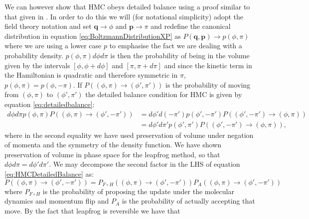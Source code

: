 \documentclass[12pt]{article}
\begin{document}
            We can however show that HMC obeys detailed balance using a proof similar to that given in \cite{duane_kennedy_pendleton_roweth_1987}. In order to do this we will (for notational simplicity) adopt the field theory notation and set $\bm{q}\rightarrow \phi$ and $\bm{p}\rightarrow \pi$ and redefine the canonical distribution in equation \ref{eq:BoltzmannDistributionXP} as $P\left(\bm{q},\bm{p}\right) \rightarrow p\left(\phi,\pi\right)$ where we are using a lower case $p$ to emphasise the fact we are dealing with a probability density. $p\left(\phi,\pi\right)d\phi d\pi$ is then the probability of being in the volume given by the intervals $\left[\phi,\phi+d\phi\right]$ and  $\left[\pi,\pi+d\pi\right]$ and since the kinetic term in the Hamiltonian is quadratic and therefore symmetric in $\pi$, $p\left(\phi,\pi\right)=p\left(\phi,-\pi\right)$. If $P\left(\left(\phi,\pi\right)\rightarrow\left(\phi',\pi'\right)\right)$ is the probability of moving from $\left(\phi,\pi\right)$ to $\left(\phi',\pi'\right)$ the detailed balance condition for HMC is given by equation \ref{eq:detailedbalance}:
            \begin{align}
                \label{eq:HMCDetailedBalance}
                d\phi d\pi p\left(\phi,\pi\right) P\left(\left(\phi,\pi\right)\rightarrow\left(\phi',-\pi'\right)\right) & = d\phi' d\left(-\pi'\right) p\left(\phi',-\pi'\right) P\left(\left(\phi',-\pi'\right)\rightarrow\left(\phi,\pi\right)\right) \\
                & = d\phi' d\pi' p\left(\phi',\pi'\right) P\left(\left(\phi',-\pi'\right)\rightarrow\left(\phi,\pi\right)\right),
            \end{align}
            where in the second equality we have used preservation of volume under negation of momenta and the symmetry of the density function. We have shown preservation of volume in phase space for the leapfrog method, so that $d\phi d\pi = d\phi' d\pi'$. We may decompose the second factor in the LHS of equation \ref{eq:HMCDetailedBalance} as:
            \begin{equation}
                P\left(\left(\phi,\pi\right) \rightarrow \left(\phi',-\pi'\right)\right) = P_{F\circ H}\left(\left(\phi,\pi\right) \rightarrow \left(\phi',-\pi'\right)\right)P_{A}\left(\left(\phi,\pi\right)\rightarrow \left(\phi',-\pi'\right)\right)
            \end{equation}
            where $P_{F\circ H}$ is the probability of proposing the update under the molecular dynamics and momentum flip and $P_A$ is the probability of actually accepting that move. By the fact that leapfrog is reversible we have that
\end{document}
